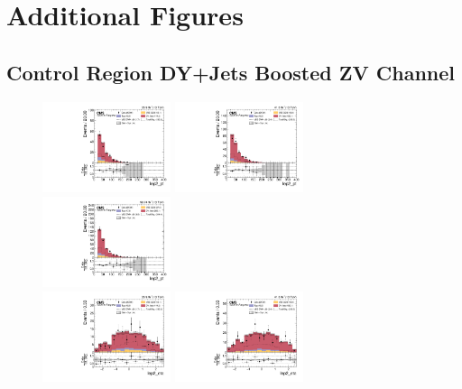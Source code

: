 \chapter{
  Additional Figures
 }

\clearpage
\section{
  Control Region DY+Jets Boosted ZV Channel
 }

\begin{figure}[!ht]
  \centering
  \includegraphics[width=0.335\textwidth]{analysis_plots/2016_zv/cr_vjets_e/lep2_pt.pdf} \hspace{-10pt}
  \includegraphics[width=0.335\textwidth]{analysis_plots/2017_zv/cr_vjets_e/lep2_pt.pdf} \hspace{-10pt}
  \includegraphics[width=0.335\textwidth]{analysis_plots/2018_zv/cr_vjets_e/lep2_pt.pdf} \hspace{-10pt} \\
  \includegraphics[width=0.335\textwidth]{analysis_plots/2016_zv/cr_vjets_e/lep2_eta.pdf} \hspace{-10pt}
  \includegraphics[width=0.335\textwidth]{analysis_plots/2017_zv/cr_vjets_e/lep2_eta.pdf} \hspace{-10pt}

\end{figure}
